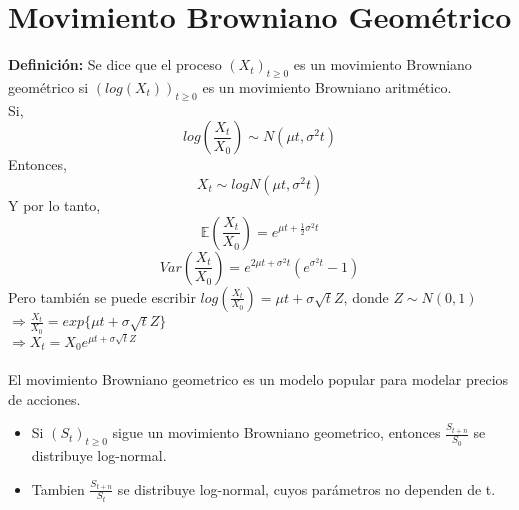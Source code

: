 \documentclass[12pts]{extarticle}
\begin{document}
\section{ Movimiento Browniano Geométrico}
\textbf{Definición:} Se dice que el proceso $(X_t)_{t\geq 0}$ es un movimiento Browniano geométrico si $(log(X_t))_{t\geq 0}$ es un movimiento Browniano aritmético. 
\\ Si, $$ log(\frac{X_t}{X_0}) \sim N(\mu t, \sigma^2 t)$$
Entonces, $$X_t \sim logN(\mu t, \sigma^2 t)$$
Y por lo tanto, $$\mathbb{E}(\frac{X_t}{X_0})=e^{ \mu t +\frac{1}{2}\sigma^2 t}$$
                         $$ Var(\frac{X_t}{X_0})=e^{2\mu t +\sigma^2 t} (e^{ \sigma^2 t}-1)$$
Pero también se puede escribir $log(\frac{X_t}{X_0})=\mu t +\sigma \sqrt{t} Z$, donde $Z\sim N(0,1)$
\\ $\Rightarrow \frac{X_t}{X_0} = exp\{\mu t+\sigma \sqrt{t} Z\}$
\\ $\Rightarrow X_t = X_0e^{\mu t+\sigma \sqrt{t} Z}$
\\ \\  El movimiento Browniano geometrico es un modelo popular para modelar precios de acciones. 
\begin{itemize} 
\item Si $(S_t)_{t \geq 0}$ sigue un movimiento Browniano geometrico, entonces $\frac{S_{t+n}}{S_0}$ se distribuye log-normal. 
\item Tambien $\frac{S_{t+n}}{S_t}$ se distribuye log-normal, cuyos parámetros no dependen de t. 
\end{itemize}
\end{document}
